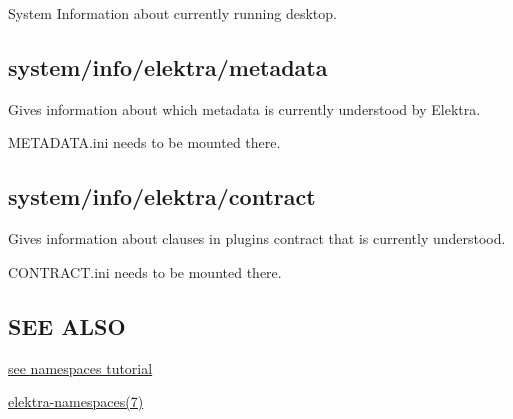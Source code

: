 System Information about currently running desktop.

\subsection*{system/info/elektra/metadata}

Gives information about which metadata is currently understood by Elektra.

{\ttfamily M\+E\+T\+A\+D\+A\+T\+A.\+ini} needs to be mounted there.

\subsection*{system/info/elektra/contract}

Gives information about clauses in plugin\textquotesingle{}s contract that is currently understood.

{\ttfamily C\+O\+N\+T\+R\+A\+C\+T.\+ini} needs to be mounted there.

\subsection*{S\+EE A\+L\+SO}


\begin{DoxyItemize}
\item \hyperlink{doc_tutorials_namespaces_md}{see namespaces tutorial}
\item \hyperlink{md_doc_help_elektra-namespaces_doc_help_elektra-namespaces_md}{elektra-\/namespaces(7)} 
\end{DoxyItemize}
